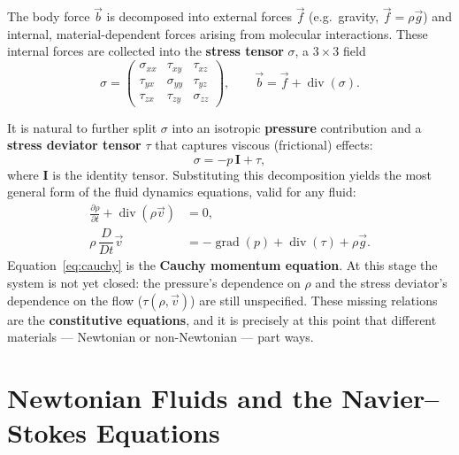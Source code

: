 \documentclass[11pt]{article}
\newcommand{\vv}{\vec{v}}
\newcommand{\vf}{\vec{f}}
\newcommand{\vb}{\vec{b}}
\newcommand{\vg}{\vec{g}}
\newcommand{\DDt}{\dfrac{D}{Dt}}
\begin{document}
The body force $\vb$ is decomposed into external forces $\vf$ (e.g.\ gravity, $\vf = \rho\vg$) and internal, material-dependent forces arising from molecular interactions. These internal forces are collected into the \textbf{stress tensor} $\sigma$, a $3\times 3$ field
\begin{equation}
  \sigma =
  \begin{pmatrix}
    \sigma_{xx} & \tau_{xy} & \tau_{xz}\\
    \tau_{yx} & \sigma_{yy} & \tau_{yz}\\
    \tau_{zx} & \tau_{zy} & \sigma_{zz}
  \end{pmatrix},
  \qquad \vb = \vf + \operatorname{div}(\sigma).
\end{equation}

It is natural to further split $\sigma$ into an isotropic \textbf{pressure} contribution and a \textbf{stress deviator tensor} $\tau$ that captures viscous (frictional) effects:
\begin{equation}
  \sigma = -p\,\mathbf{I} + \tau ,
\end{equation}
where $\mathbf{I}$ is the identity tensor. Substituting this decomposition yields the most general form of the fluid dynamics equations, valid for any fluid:
\begin{align}
  \frac{\partial \rho}{\partial t} + \operatorname{div}(\rho\vv) &= 0, \label{eq:cont2}\\
  \rho\,\DDt\vv &= -\operatorname{grad}(p) + \operatorname{div}(\tau) + \rho\vg. \label{eq:cauchy}
\end{align}
Equation~\eqref{eq:cauchy} is the \textbf{Cauchy momentum equation}. At this stage the system is not yet closed: the pressure's dependence on $\rho$ and the stress deviator's dependence on the flow ($\tau(\rho,\vv)$) are still unspecified. These missing relations are the \textbf{constitutive equations}, and it is precisely at this point that different materials — Newtonian or non-Newtonian — part ways.

\section{Newtonian Fluids and the Navier--Stokes Equations}
\end{document}
